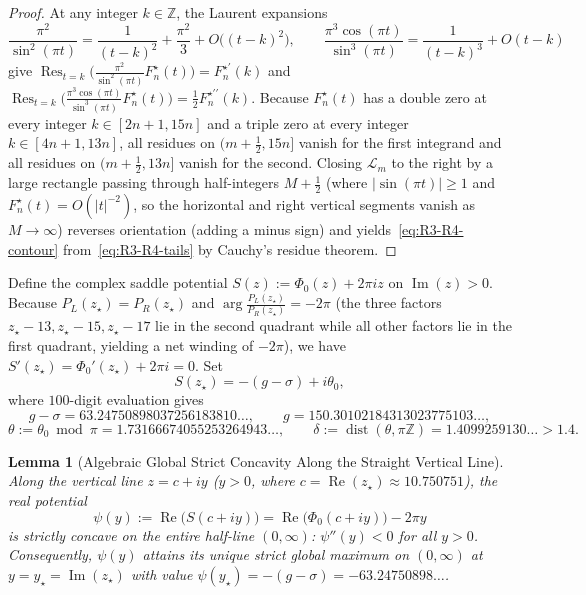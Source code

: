 \documentclass[11pt,reqno]{amsart}
\newtheorem{lemma}[theorem]{Lemma}
\theoremstyle{definition}
\theoremstyle{remark}
\newcommand{\ZZ}{\mathbb{Z}}
\newcommand{\Res}{\operatorname{Res}}
\newcommand{\dist}{\operatorname{dist}}
\begin{document}
\begin{proof}
At any integer $k \in \ZZ$, the Laurent expansions
\[
  \frac{\pi^2}{\sin^2(\pi t)} = \frac{1}{(t-k)^2} + \frac{\pi^2}{3} + O\bigl((t-k)^2\bigr),
  \qquad
  \frac{\pi^3 \cos(\pi t)}{\sin^3(\pi t)} = \frac{1}{(t-k)^3} + O(t-k)
\]
give $\Res_{t=k}\bigl(\frac{\pi^2}{\sin^2(\pi t)} F_n^{\star}(t)\bigr) = F_n^{\star\prime}(k)$ and $\Res_{t=k}\bigl(\frac{\pi^3\cos(\pi t)}{\sin^3(\pi t)} F_n^{\star}(t)\bigr) = \frac{1}{2}F_n^{\star\prime\prime}(k)$. Because $F_n^{\star}(t)$ has a double zero at every integer $k \in [2n+1, 15n]$ and a triple zero at every integer $k \in [4n+1, 13n]$, all residues on $(m+\frac{1}{2}, 15n]$ vanish for the first integrand and all residues on $(m+\frac{1}{2}, 13n]$ vanish for the second. Closing $\mathcal{L}_m$ to the right by a large rectangle passing through half-integers $M + \frac{1}{2}$ (where $|\sin(\pi t)| \ge 1$ and $F_n^{\star}(t) = O(|t|^{-2})$, so the horizontal and right vertical segments vanish as $M \to \infty$) reverses orientation (adding a minus sign) and yields~\eqref{eq:R3-R4-contour} from~\eqref{eq:R3-R4-tails} by Cauchy's residue theorem.
\end{proof}

Define the complex saddle potential $S(z) := \Phi_0(z) + 2\pi i z$ on $\operatorname{Im}(z) > 0$. Because $P_L(z_\star) = P_R(z_\star)$ and $\arg\frac{P_L(z_\star)}{P_R(z_\star)} = -2\pi$ (the three factors $z_\star - 13, z_\star - 15, z_\star - 17$ lie in the second quadrant while all other factors lie in the first quadrant, yielding a net winding of $-2\pi$), we have $S'(z_\star) = \Phi_0'(z_\star) + 2\pi i = 0$. Set
\begin{equation}
\label{eq:Sstar}
  S(z_\star) = -(g - \sigma) + i\theta_0,
\end{equation}
where $100$-digit evaluation gives
\[
  g - \sigma = 63.24750898037256183810\ldots,
  \qquad
  g = 150.30102184313023775103\ldots,
\]
\[
  \theta := \theta_0 \bmod \pi = 1.73166674055253264943\ldots,
  \qquad
  \delta := \dist(\theta, \pi\ZZ) = 1.4099259130\ldots > 1.4.
\]

\begin{lemma}[Algebraic Global Strict Concavity Along the Straight Vertical Line]
\label{lem:concavity}
Along the vertical line $z = c + i y$ ($y > 0$, where $c = \operatorname{Re}(z_\star) \approx 10.750751$), the real potential
\[
  \psi(y) := \operatorname{Re}\bigl(S(c + i y)\bigr) = \operatorname{Re}\bigl(\Phi_0(c + i y)\bigr) - 2\pi y
\]
is strictly concave on the entire half-line $(0, \infty)$: $\psi''(y) < 0$ for all $y > 0$. Consequently, $\psi(y)$ attains its unique strict global maximum on $(0, \infty)$ at $y = y_\star = \operatorname{Im}(z_\star)$ with value $\psi(y_\star) = -(g - \sigma) = -63.24750898\ldots$.
\end{lemma}
\end{document}
